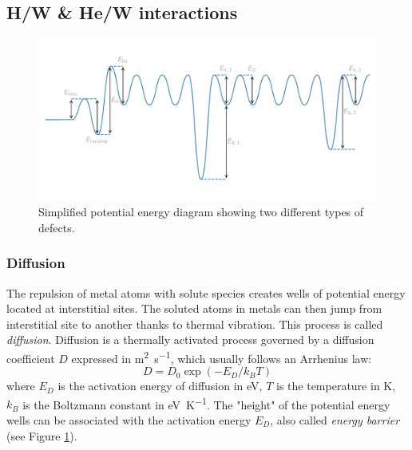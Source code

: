 \subsection{H/W \& He/W interactions}


\begin{figure} [h]
    \centering
    \includegraphics[width=\linewidth]{Figures/Chapter1/potential_energy_diagram.pdf}
    \caption{Simplified potential energy diagram showing two different types of defects.}
    \label{fig: potential energy diagram metal lattice}
\end{figure}

\subsubsection{Diffusion}
The repulsion of metal atoms with solute species creates wells of potential energy located at interstitial sites.
The soluted atoms in metals can then jump from interstitial site to another thanks to thermal vibration.
This process is called \textit{diffusion}.
Diffusion is a thermally activated process governed by a diffusion coefficient $D$ expressed in \si{m^2.s^{-1}}, which usually follows an Arrhenius law:
\begin{equation}
    D = D_0 \exp{(-E_D/k_B T)}
\end{equation}
where $E_D$ is the activation energy of diffusion in \si{eV}, $T$ is the temperature in \si{K}, $k_B$ is the Boltzmann constant in \si{eV.K^{-1}}.
The "height" of the potential energy wells can be associated with the activation energy $E_D$, also called \textit{energy barrier} (see Figure \ref{fig: potential energy diagram metal lattice}).

